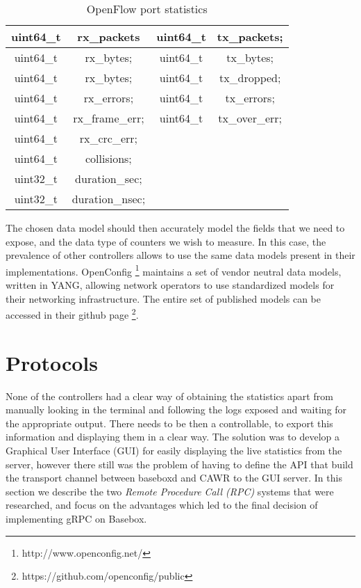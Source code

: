 \begin{table}[H]
    \centering
    \caption{OpenFlow port statistics}
    \begin{tabular}{c | c || c | c}
       uint64\_t & rx\_packets     & uint64\_t & tx\_packets;     \\ \hline
       uint64\_t & rx\_bytes;      & uint64\_t & tx\_bytes;       \\ \hline
       uint64\_t & rx\_bytes;      & uint64\_t & tx\_dropped;     \\ \hline
       uint64\_t & rx\_errors;     & uint64\_t & tx\_errors;      \\ \hline
       uint64\_t & rx\_frame\_err; & uint64\_t & tx\_over\_err;   \\ \hline
       uint64\_t & rx\_crc\_err;   &                              \\ \hline
       uint64\_t & collisions;     &                              \\ \hline
       uint32\_t & duration\_sec;  &                              \\ \hline
       uint32\_t & duration\_nsec; &                 
    \end{tabular}
\end{table}

\par The chosen data model should then accurately model the fields that we need to expose, and the data type of counters we wish to measure. In this case,
the prevalence of other controllers allows to use the same data models present in their implementations. OpenConfig \footnote{http://www.openconfig.net/} maintains
a set of vendor neutral data models, written in YANG, allowing network operators to use standardized models for their networking infrastructure.
The entire set of published models can be accessed in their github page \footnote {https://github.com/openconfig/public}.

\section {Protocols}

None of the controllers had a clear way of obtaining the statistics apart from manually looking in the terminal and following the logs exposed and waiting for the
appropriate output. There needs to be then a controllable, to export this information and displaying them in a clear way. The solution was to develop a Graphical
User Interface (GUI) for easily displaying the live statistics from the server, however there still was the problem of having to define the API that build the
transport channel between baseboxd and CAWR to the GUI server. In this section we describe the two \textit {Remote Procedure Call (RPC)} systems that were researched,
and focus on the advantages which led to the final decision of implementing gRPC on Basebox.

